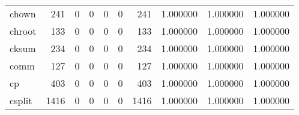 \begin{tabular}{lrrrrrrrrr}
chown     &                                                241 &                                                  0 &                                                  0 &                                                  0 &                                                  0 &                                                241 &                                           1.000000 &                               1.000000 &                             1.000000 \\
chroot    &                                                133 &                                                  0 &                                                  0 &                                                  0 &                                                  0 &                                                133 &                                           1.000000 &                               1.000000 &                             1.000000 \\
cksum     &                                                234 &                                                  0 &                                                  0 &                                                  0 &                                                  0 &                                                234 &                                           1.000000 &                               1.000000 &                             1.000000 \\
comm      &                                                127 &                                                  0 &                                                  0 &                                                  0 &                                                  0 &                                                127 &                                           1.000000 &                               1.000000 &                             1.000000 \\
cp        &                                                403 &                                                  0 &                                                  0 &                                                  0 &                                                  0 &                                                403 &                                           1.000000 &                               1.000000 &                             1.000000 \\
csplit    &                                               1416 &                                                  0 &                                                  0 &                                                  0 &                                                  0 &                                               1416 &                                           1.000000 &                               1.000000 &                             1.000000 \\

\end{tabular}
